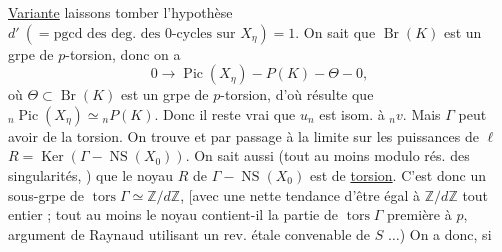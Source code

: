 \uline{Variante} laissons tomber l'hypothèse $d'\ (=\mathrm{pgcd}\text{ des deg. des 0-cycles sur }X_\eta)=1$.
On sait que $\operatorname{Br}(K)$ est un grpe de $p$-torsion, donc on a
\[
0\longrightarrow\operatorname{Pic}(X_\eta)\mathbin{-}P(K)\mathbin{-}\Theta\mathbin{-}0,
\]
où $\Theta\subset\operatorname{Br}(K)$ est un grpe de $p$-torsion, d'où résulte que ${}_n\operatorname{Pic}(X_\eta)\simeq{}_nP(K)$. Donc il reste vrai que $u_n$ est isom. à ${}_nv$. Mais $\Gamma$ peut avoir de la torsion. On trouve
 et par passage à la limite sur les puissances de $\ell$
$R=\operatorname{Ker}(\Gamma\mathbin{-}\operatorname{NS}(X_0))$.
On sait aussi (tout au moins modulo rés. des singularités, ) que le noyau $R$ de $\Gamma\mathbin{-}\operatorname{NS}(X_0)$ est de \uline{torsion}.  C'est donc un sous-grpe de $\operatorname{tors}\Gamma\simeq\mathbb Z/d\mathbb Z$, [avec une nette tendance d'être égal à $\mathbb Z/d\mathbb Z$ tout entier ;  tout au moins le noyau contient-il la partie de $\operatorname{tors}\Gamma$ première à $p$,  argument de Raynaud utilisant un rev. étale convenable de $S$ $\ldots$) On a donc, si
